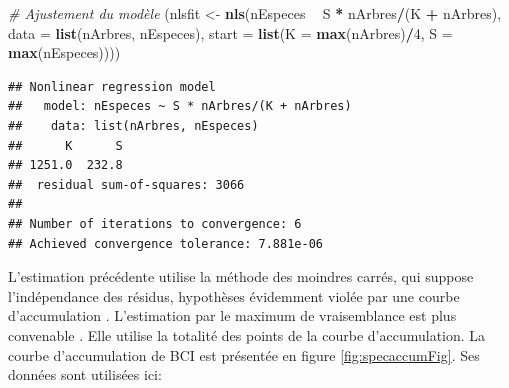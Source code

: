 \documentclass[
  11pt,
  french,
  a4paper,
  extrafontsizes,onecolumn,openright
  ]{memoir}
\newenvironment{Shaded}{\begin{snugshade}}{\end{snugshade}}
\newcommand{\CommentTok}[1]{\textcolor[rgb]{0.56,0.35,0.01}{\textit{#1}}}
\newcommand{\DataTypeTok}[1]{\textcolor[rgb]{0.13,0.29,0.53}{#1}}
\newcommand{\DecValTok}[1]{\textcolor[rgb]{0.00,0.00,0.81}{#1}}
\newcommand{\KeywordTok}[1]{\textcolor[rgb]{0.13,0.29,0.53}{\textbf{#1}}}
\newcommand{\NormalTok}[1]{#1}
\newcommand{\OperatorTok}[1]{\textcolor[rgb]{0.81,0.36,0.00}{\textbf{#1}}}
\newcommand{\StringTok}[1]{\textcolor[rgb]{0.31,0.60,0.02}{#1}}
\begin{document}
\scriptsize

\begin{Shaded}
\begin{Highlighting}[]
\CommentTok{# Ajustement du modèle}
\NormalTok{(nlsfit <-}\StringTok{ }\KeywordTok{nls}\NormalTok{(nEspeces }\OperatorTok{~}\StringTok{ }\NormalTok{S }\OperatorTok{*}\StringTok{ }\NormalTok{nArbres}\OperatorTok{/}\NormalTok{(K }\OperatorTok{+}\StringTok{ }\NormalTok{nArbres), }\DataTypeTok{data =} \KeywordTok{list}\NormalTok{(nArbres,}
\NormalTok{    nEspeces), }\DataTypeTok{start =} \KeywordTok{list}\NormalTok{(}\DataTypeTok{K =} \KeywordTok{max}\NormalTok{(nArbres)}\OperatorTok{/}\DecValTok{4}\NormalTok{, }\DataTypeTok{S =} \KeywordTok{max}\NormalTok{(nEspeces))))}
\end{Highlighting}
\end{Shaded}

\begin{verbatim}
## Nonlinear regression model
##   model: nEspeces ~ S * nArbres/(K + nArbres)
##    data: list(nArbres, nEspeces)
##      K      S 
## 1251.0  232.8 
##  residual sum-of-squares: 3066
## 
## Number of iterations to convergence: 6 
## Achieved convergence tolerance: 7.881e-06
\end{verbatim}

\normalsize

L'estimation précédente utilise la méthode des moindres carrés, qui suppose l'indépendance des résidus, hypothèses évidemment violée par une courbe d'accumulation \autocite{Colwell1994}.
L'estimation par le maximum de vraisemblance est plus convenable \autocite{Raaijmakers1987}.
Elle utilise la totalité des points de la courbe d'accumulation.
La courbe d'accumulation de BCI est présentée en figure \ref{fig:specaccumFig}.
Ses données sont utilisées ici:

\scriptsize
\end{document}
